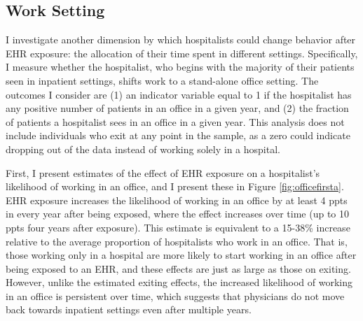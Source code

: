 \documentclass[12pt]{article}
\begin{document}
\subsection{Work Setting}

I investigate another dimension by which hospitalists could change behavior after EHR exposure: the allocation of their time spent in different settings. Specifically, I measure whether the hospitalist, who begins with the majority of their patients seen in inpatient settings, shifts work to a stand-alone office setting. The outcomes I consider are (1) an indicator variable equal to 1 if the hospitalist has any positive number of patients in an office in a given year, and (2) the fraction of patients a hospitalist sees in an office in a given year. This analysis does not include individuals who exit at any point in the sample, as a zero could indicate dropping out of the data instead of working solely in a hospital. 

First, I present estimates of the effect of EHR exposure on a hospitalist's likelihood of working in an office, and I present these in Figure \ref{fig:officefirsta}. EHR exposure increases the likelihood of working in an office by at least 4 ppts in every year after being exposed, where the effect increases over time (up to 10 ppts four years after exposure). This estimate is equivalent to a 15-38\% increase relative to the average proportion of hospitalists who work in an office. That is, those working only in a hospital are more likely to start working in an office after being exposed to an EHR, and these effects are just as large as those on exiting. However, unlike the estimated exiting effects, the increased likelihood of working in an office is persistent over time, which suggests that physicians do not move back towards inpatient settings even after multiple years. 
\end{document}
